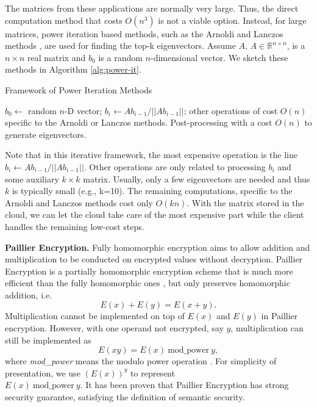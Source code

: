 \documentclass[10pt, conference, compsocconf]{IEEEtran}
\begin{document}
The matrices from these applications are normally very large. Thus, the direct computation method that costs $O(n^3)$ is not a viable option. Instead, for large matrices, power iteration based methods, such as the Arnoldi \cite{arnoldi51} and Lanczos methods \cite{cullum85}, are used for finding the top-k eigenvectors. 
Assume $A$, $A\in \mathbb{R}^{n\times n}$, is a $n\times n$ real matrix and $b_0$ is a random $n$-dimensional vector. We sketch these methods in Algorithm \ref{alg:power-it}.
\begin{algorithm}[htb]
\caption{Framework of Power Iteration Methods}\label{alg:power-it}
\begin{algorithmic}[1]
\STATE $b_0 \leftarrow$ random $n$-D vector;  
\STATE $b_i\leftarrow Ab_{i-1}/|| Ab_{i-1}||$;
\STATE other operations of cost $O(n)$ specific to the Arnoldi or Lanczos methods.  
\ENDFOR
\STATE Post-processing with a cost $O(n)$ to generate eigenvectors. 
\end{algorithmic}
\end{algorithm}

Note that in this iterative framework, the most expensive operation is the line $b_i\leftarrow Ab_{i-1}/|| Ab_{i-1}||$. Other operations are only related to processing $b_i$ and some auxiliary $k\times k$ matrix. Usually, only a few eigenvectors are needed and thus $k$ is typically small (e.g., k=10). The remaining computations, specific to the Arnoldi and Lanczos methods cost only $O(kn)$. With the matrix stored in the cloud, we can let the cloud take care of the most expensive part while the client handles the remaining low-cost steps. 


\textbf{Paillier Encryption.} 
Fully homomorphic encryption aims to allow addition and multiplication to be conducted on encrypted values without decryption. Paillier Encryption is a partially homomorphic encryption scheme that is much more efficient than the fully homomorphic ones \cite{gentry09}, but only preserves homomorphic addition, i.e. 
\begin{equation}
E(x) + E(y) = E(x+y).
\end{equation}
Multiplication cannot be implemented on top of $E(x)$ and $E(y)$ in Paillier encryption. However, with one operand not encrypted, say $y$, multiplication can still be implemented as
\begin{equation}
E(xy) = E(x) ~\text{mod\_power} ~ y,
\end{equation}
where \emph{mod\_power} means the modulo power operation \cite{katz07}. For simplicity of presentation, we use $(E(x))^y$ to represent \\$E(x)\ \text{mod\_power}\ y$. It has been proven that Paillier Encryption has strong security guarantee, satisfying the definition of semantic security.
\end{document}
